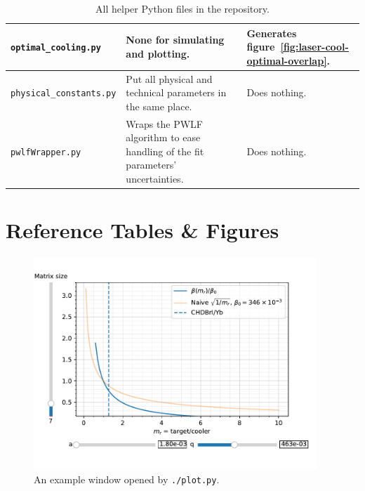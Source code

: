 \begin{table}
\begin{tabularx}{\textwidth}{l|X|X}
\hline
\texttt{optimal\_cooling.py}    & None for simulating and plotting.                                                                                                                      & Generates figure~\ref{fig:laser-cool-optimal-overlap}.                                                                                                                                                                                              \\
\hline
\texttt{physical\_constants.py} & Put all physical and technical parameters in the same place.                                                                                           & Does nothing.                                                                                                                                                                                                                                        \\
\hline
\texttt{pwlfWrapper.py}         & Wraps the PWLF algorithm to ease handling of the fit parameters' uncertainties.                                                                        & Does nothing.
\end{tabularx}
\caption{All helper Python files in the repository.}
\label{tbl:helper-scripts}
\end{table}

\section{Reference Tables \& Figures}

\begin{figure}[h]
	\begin{center}
		\includegraphics[width=0.95\textwidth]{graphics/software-plot-example.pdf}
	\end{center}
	\caption{An example window opened by \texttt{./plot.py}.}
	\label{fig:software-plot-example}
\end{figure}

